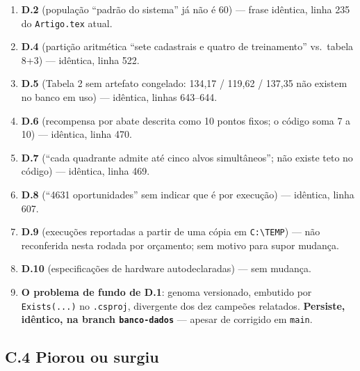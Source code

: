 \documentclass[11pt,a4paper]{article}
\begin{document}
\begin{enumerate}
  \item \textbf{D.2} (população ``padrão do sistema'' já não é 60) --- frase idêntica, linha 235 do
  \texttt{Artigo.tex} atual.
  \item \textbf{D.4} (partição aritmética ``sete cadastrais e quatro de treinamento'' vs.\ tabela
  8+3) --- idêntica, linha 522.
  \item \textbf{D.5} (Tabela 2 sem artefato congelado: 134,17 / 119,62 / 137,35 não existem no banco
  em uso) --- idêntica, linhas 643--644.
  \item \textbf{D.6} (recompensa por abate descrita como 10 pontos fixos; o código soma 7 a 10) ---
  idêntica, linha 470.
  \item \textbf{D.7} (``cada quadrante admite até cinco alvos simultâneos''; não existe teto no
  código) --- idêntica, linha 469.
  \item \textbf{D.8} (``4631 oportunidades'' sem indicar que é por execução) --- idêntica, linha 607.
  \item \textbf{D.9} (execuções reportadas a partir de uma cópia em \texttt{C:\textbackslash TEMP}) ---
  não reconferida nesta rodada por orçamento; sem motivo para supor mudança.
  \item \textbf{D.10} (especificações de hardware autodeclaradas) --- sem mudança.
  \item \textbf{O problema de fundo de D.1}: genoma versionado, embutido por \texttt{Exists(...)} no
  \texttt{.csproj}, divergente dos dez campeões relatados. \textbf{Persiste, idêntico, na branch
  \texttt{banco-dados}} --- apesar de corrigido em \texttt{main}.
\end{enumerate}

\subsection*{C.4 Piorou ou surgiu}
\end{document}
